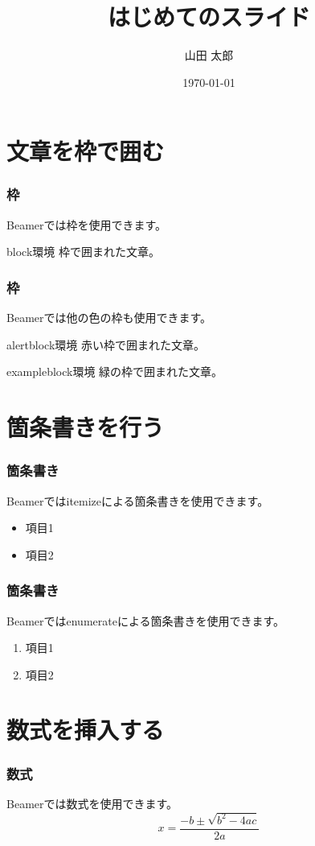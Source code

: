 \documentclass{beamer}
\title{はじめてのスライド}
\author{山田 太郎}
\institute{羅手府大学}
\date{\today}
\begin{document}
\maketitle
\section{文章を枠で囲む}
\begin{frame}
  \frametitle{枠}
  Beamerでは枠を使用できます。
  \begin{block}{block環境}
    枠で囲まれた文章。
  \end{block}
\end{frame}

\begin{frame}
  \frametitle{枠}
  Beamerでは他の色の枠も使用できます。
  \begin{alertblock}{alertblock環境}
    赤い枠で囲まれた文章。
  \end{alertblock}
  \begin{exampleblock}{exampleblock環境}
    緑の枠で囲まれた文章。
  \end{exampleblock}
\end{frame}

\section{箇条書きを行う}
\begin{frame}
  \frametitle{箇条書き}
  Beamerではitemizeによる箇条書きを使用できます。
  \begin{itemize}
    \item
    項目1
    \item
    項目2
  \end{itemize}
\end{frame}

\begin{frame}
  \frametitle{箇条書き}
  Beamerではenumerateによる箇条書きを使用できます。
  \begin{enumerate}
    \item
    項目1
    \item
    項目2
  \end{enumerate}
\end{frame}

\section{数式を挿入する}
\begin{frame}
\frametitle{数式}
Beamerでは数式を使用できます。
\[ x = \frac{-b \pm \sqrt{b^2 - 4ac}}{2a} \]
\end{frame}
\end{document}
